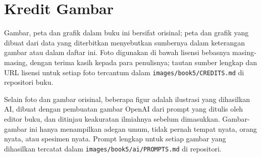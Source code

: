 \chapter*{Kredit Gambar}

Gambar, peta dan grafik dalam buku ini bersifat orisinal; peta dan grafik yang
dibuat dari data yang diterbitkan menyebutkan sumbernya dalam keterangan gambar
atau dalam daftar ini. Foto digunakan di bawah lisensi bebasnya masing-masing,
dengan terima kasih kepada para penulisnya; tautan sumber lengkap dan URL lisensi
untuk setiap foto tercantum dalam \texttt{images/book5/CREDITS.md} di repositori buku.

\bigskip
Selain foto dan gambar orisinal, beberapa figur adalah ilustrasi yang dihasilkan AI,
dibuat dengan pembuatan gambar OpenAI dari prompt yang ditulis oleh editor buku, dan
ditinjau keakuratan ilmiahnya sebelum dimasukkan. Gambar-gambar ini hanya menampilkan
adegan umum, tidak pernah tempat nyata, orang nyata, atau spesimen nyata. Prompt
lengkap untuk setiap gambar yang dihasilkan tercatat dalam
\texttt{images/book5/ai/PROMPTS.md} di repositori.


